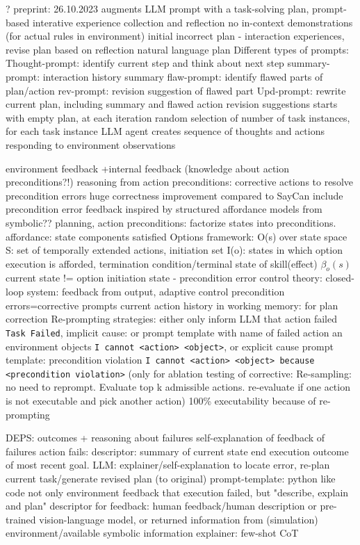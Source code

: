 \documentclass{article}
\begin{document}
? \cite{ouyang_autoplan_2023} preprint: 26.10.2023
augments LLM prompt with a task-solving plan, prompt-based
interative experience collection and reflection
no in-context demonstrations (for actual rules in environment)
initial incorrect plan - interaction experiences, revise plan based on reflection
natural language plan
Different types of prompts:
Thought-prompt: identify current step and think about next step
summary-prompt: interaction history summary
flaw-prompt: identify flawed parts of plan/action
rev-prompt: revision suggestion of flawed part
Upd-prompt: rewrite current plan, including summary and flawed action revision suggestions
starts with empty plan, at each iteration random selection of number of task instances, for each task instance LLM agent creates sequence of thoughts and actions responding to environment observations

\cite{raman_cape_2023} environment feedback +internal feedback (knowledge about action preconditions?!)
reasoning from action preconditions: corrective actions to resolve precondition errors
huge correctness improvement compared to SayCan
include precondition error feedback
inspired by structured affordance models from symbolic?? planning, action preconditions: factorize states into preconditions. affordance: state components satisfied
Options framework: O(s) over state space S: set of temporally extended actions, initiation set I(o): states in which option execution is afforded, termination condition/terminal state of skill(effect) $\beta_o (s)$
current state != option initiation state - precondition error
control theory: closed-loop system: feedback from output, adaptive control
precondition errors=corrective prompts
current action history in working memory: for plan correction
Re-prompting strategies: either only inform LLM that action failed \verb|Task Failed|, implicit cause: or prompt template with name of failed action an environment objects \verb|I cannot <action> <object>|, or explicit cause prompt template: precondition violation \verb|I cannot <action> <object> because <precondition violation>|
(only for ablation testing of corrective: Re-sampling: no need to reprompt. Evaluate top k admissible actions. re-evaluate if one action is not executable and pick another action)
100\% executability because of re-prompting

DEPS: outcomes + reasoning about failures
\cite{wang_describe_2023}
self-explanation of feedback of failures
action fails: descriptor: summary of current state end execution outcome of most recent goal. LLM: explainer/self-explanation to locate error, re-plan current task/generate revised plan (to original)
prompt-template: python like code
not only environment feedback that execution failed, but "describe, explain and plan"
descriptor for feedback: human feedback/human description or pre-trained vision-language model, or returned information from (simulation) environment/available symbolic information
explainer: few-shot CoT
\end{document}
